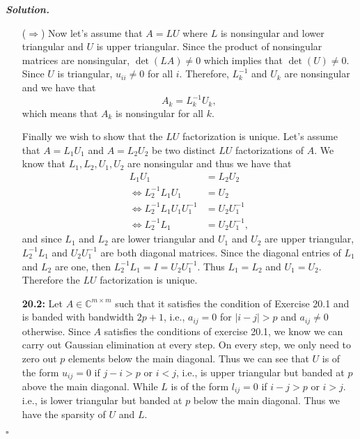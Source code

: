 \documentclass[12pt]{report}
\newenvironment{solution}[1][\it{Solution}]{\textbf{#1. } }{$\square$}
\def\C{{\mathbb C}}
\begin{document}
\begin{solution}
\begin{enumerate}
            \noindent
            ($\Rightarrow$)
            Now let's assume that $A = LU$ where $L$ is nonsingular and lower triangular and $U$ is upper triangular. Since the product of nonsingular matrices are nonsingular, $\det(LA) \neq 0$ which implies that $\det(U) \neq 0$. Since $U$ is triangular, $u_{ii} \neq 0$ for all $i$. Therefore, $L^{-1}_k$ and $U_k$ are nonsingular and we have that
            \[ A_k = L^{-1}_k U_k,\]
            which means that $A_k$ is nonsingular for all $k$.

            \noindent
            Finally we wish to show that the $LU$ factorization is unique. Let's assume that $A = L_1U_1$ and $A = L_2U_2$ be two distinct $LU$ factorizations of $A$. We know that $L_1,L_2,U_1,U_2$ are nonsingular and thus we have that
            \begin{align*}
                L_1U_1 &= L_2 U_2\\
                \iff L_2^{-1}L_1U_1 &= U_2\\
                \iff L_2^{-1}L_1U_1U_1^{-1} &= U_2U_1^{-1}\\
                \iff L_2^{-1}L_1 &= U_2U_1^{-1},
            \end{align*}
            and since $L_1$ and $L_2$ are lower triangular and $U_1$ and $U_2$ are upper triangular, $L_2^{-1}L_1$ and $U_2U_1^{-1}$ are both diagonal matrices. Since the diagonal entries of $L_1$ and $L_2$ are one, then $L_2^{-1}L_1 = I = U_2U_1^{-1}$. Thus $L_1 = L_2$ and $U_1 = U_2$. Therefore the $LU$ factorization is unique.


        \item [{\bf 20.2:}]
            Let $A \in \C^{m \times m}$ such that it satisfies the condition of Exercise 20.1 and is banded with bandwidth $2p + 1$, i.e., $a_{ij} =0$ for $|i -j| > p$ and $a_{ij} \neq 0$ otherwise. Since $A$ satisfies the conditions of exercise 20.1, we know we can carry out Gaussian elimination at every step. On every step, we only need to zero out $p$ elements below the main diagonal. Thus we can see that $U$ is of the form $u_{ij} = 0$ if $j - i > p$ or $i < j$, i.e., is upper triangular but banded at $p$ above the main diagonal. While $L$ is of the form $l_{ij} = 0$ if $i - j > p$ or $i > j$. i.e., is lower triangular but banded at $p$ below the main diagonal. Thus we have the sparsity of $U$ and $L$. 
            

\end{enumerate}
\end{solution}
\end{document}
